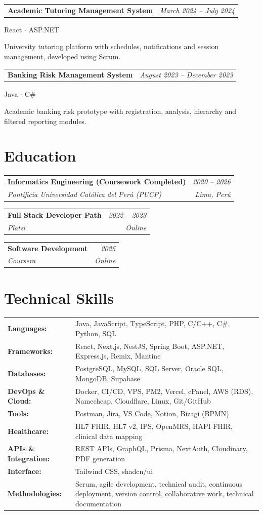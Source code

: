 \documentclass[a4paper,10pt]{article}
\makeatletter
\newcommand{\cvsubheading}[4]{
  \vspace{2pt}
  \begin{tabularx}{\textwidth}{@{}X r@{}}
    \textbf{#1} & \textit{\small #2} \\
    \textit{\small\color{graytext} #3} & \textit{\small\color{graytext} #4} \\
  \end{tabularx}\vspace{-2pt}
}
\newcommand{\cvproject}[3]{
  \vspace{2pt}
  \begin{tabularx}{\textwidth}{@{}X r@{}}
    \textbf{#1} & \textit{\small #2} \\
  \end{tabularx}
  {\small\color{graytext} #3}\vspace{-2pt}
}
\makeatother
\begin{document}
\cvproject{Academic Tutoring Management System}{March 2024 -- July 2024}{React $\cdot$ ASP.NET}
\par\smallskip University tutoring platform with schedules, notifications and session management, developed using Scrum.\par\medskip

\cvproject{Banking Risk Management System}{August 2023 -- December 2023}{Java $\cdot$ C\#}
\par\smallskip Academic banking risk prototype with registration, analysis, hierarchy and filtered reporting modules.\par\medskip

\section{Education}

\cvsubheading
  {Informatics Engineering (Coursework Completed)}{2020 -- 2026}
  {Pontificia Universidad Cat\'olica del Per\'u (PUCP)}{Lima, Per\'u}

\vspace{2pt}
\cvsubheading
  {Full Stack Developer Path}{2022 -- 2023}
  {Platzi}{Online}

\vspace{2pt}
\cvsubheading
  {Software Development}{2025}
  {Coursera}{Online}

\section{Technical Skills}

\begin{tabularx}{\textwidth}{@{}l X@{}}
  \textbf{Languages:} & Java, JavaScript, TypeScript, PHP, C/C++, C\#, Python, SQL \\[3pt]
  \textbf{Frameworks:} & React, Next.js, NestJS, Spring Boot, ASP.NET, Express.js, Remix, Mantine \\[3pt]
  \textbf{Databases:} & PostgreSQL, MySQL, SQL Server, Oracle SQL, MongoDB, Supabase \\[3pt]
  \textbf{DevOps \& Cloud:} & Docker, CI/CD, VPS, PM2, Vercel, cPanel, AWS (RDS), Namecheap, Cloudflare, Linux, Git/GitHub \\[3pt]
  \textbf{Tools:} & Postman, Jira, VS Code, Notion, Bizagi (BPMN) \\[3pt]
  \textbf{Healthcare:} & HL7 FHIR, HL7 v2, IPS, OpenMRS, HAPI FHIR, clinical data mapping \\[3pt]
  \textbf{APIs \& Integration:} & REST APIs, GraphQL, Prisma, NextAuth, Cloudinary, PDF generation \\[3pt]
  \textbf{Interface:} & Tailwind CSS, shadcn/ui \\[3pt]
  \textbf{Methodologies:} & Scrum, agile development, technical audit, continuous deployment, version control, collaborative work, technical documentation \\
\end{tabularx}
\end{document}
